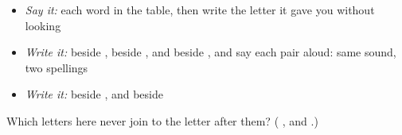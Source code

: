 \begin{itemize}
\raggedright
  \item \emph{Say it:} each word in the table, then write the letter it gave you without looking
  \item \emph{Write it:}  beside ,  beside , and  beside , and say each pair aloud: same sound, two spellings
  \item \emph{Write it:}  beside , and  beside 
\end{itemize}

\begin{tcolorbox}[breakable,colback=teal!4,colframe=teal!35!black,title={Before you move on}]
Which letters here never join to the letter after them? (\textbf{  }, and \textbf{}.)
\end{tcolorbox}
